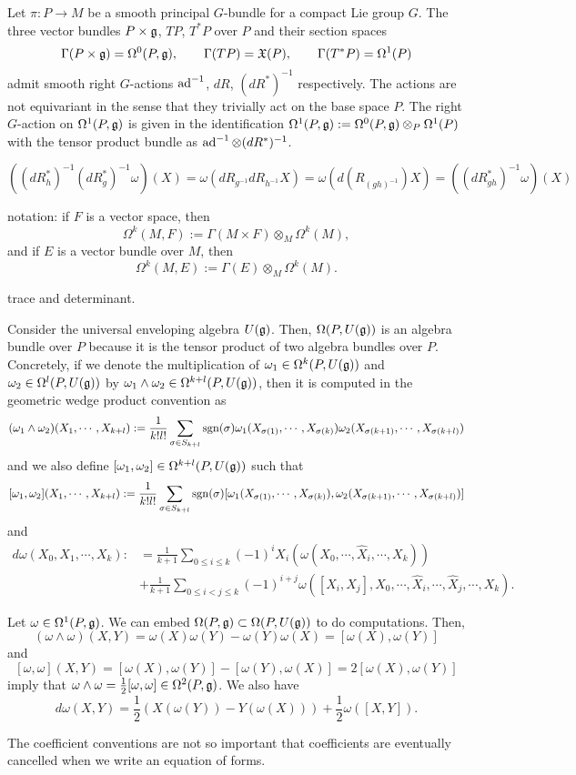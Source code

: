 \documentclass{../../large}
\begin{document}
\begin{prb}
Let $\pi:P\to M$ be a smooth principal $G$-bundle for a compact Lie group $G$.
The three vector bundles $P\times\mathfrak{g}$, $TP$, $T^*P$ over $P$ and their section spaces
\[\Gamma(P\times\mathfrak{g})=\Omega^0(P,\mathfrak{g}),\qquad\Gamma(TP)=\mathfrak{X}(P),\qquad\Gamma(T^*P)=\Omega^1(P)\]
admit smooth right $G$-actions $\operatorname{ad}^{-1}$, $dR$, $(dR^*)^{-1}$ respectively.
The actions are not equivariant in the sense that they trivially act on the base space $P$.
The right $G$-action on $\Omega^1(P,\mathfrak{g})$ is given in the identification $\Omega^1(P,\mathfrak{g}):=\Omega^0(P,\mathfrak{g})\otimes_P\Omega^1(P)$ with the tensor product bundle as $\operatorname{ad}^{-1}\otimes(dR^*)^{-1}$.

\[((dR^*_h)^{-1}(dR^*_g)^{-1}\omega)(X)
=\omega(dR_{g^{-1}}dR_{h^{-1}}X)
=\omega(d(R_{(gh)^{-1}})X)
=((dR^*_{gh})^{-1}\omega)(X)\]


notation: if $F$ is a vector space, then
\[\Omega^k(M,F):=\Gamma(M\times F)\otimes_M\Omega^k(M),\]
and if $E$ is a vector bundle over $M$, then
\[\Omega^k(M,E):=\Gamma(E)\otimes_M\Omega^k(M).\]

 trace and determinant.

Consider the universal enveloping algebra $U(\mathfrak{g})$.
Then, $\Omega(P,U(\mathfrak{g}))$ is an algebra bundle over $P$ because it is the tensor product of two algebra bundles over $P$.
Concretely, if we denote the multiplication of $\omega_1\in\Omega^k(P,U(\mathfrak{g}))$ and $\omega_2\in\Omega^l(P,U(\mathfrak{g}))$ by $\omega_1\wedge\omega_2\in\Omega^{k+l}(P,U(\mathfrak{g}))$, then it is computed in the geometric wedge product convention as
\[(\omega_1\wedge\omega_2)(X_1,\cdots,X_{k+l}):=\frac1{k!l!}\sum_{\sigma\in S_{k+l}}\operatorname{sgn}(\sigma)\omega_1(X_{\sigma(1)},\cdots,X_{\sigma(k)})\omega_2(X_{\sigma(k+1)},\cdots,X_{\sigma(k+l)})\]
and we also define $[\omega_1,\omega_2]\in\Omega^{k+l}(P,U(\mathfrak{g}))$ such that
\[[\omega_1,\omega_2](X_1,\cdots,X_{k+l}):=\frac1{k!l!}\sum_{\sigma\in S_{k+l}}\operatorname{sgn}(\sigma)[\omega_1(X_{\sigma(1)},\cdots,X_{\sigma(k)}),\omega_2(X_{\sigma(k+1)},\cdots,X_{\sigma(k+l)})]\]
and
\begin{align*}
d\omega(X_0,X_1,\cdots,X_k):&=\frac1{k+1}\sum_{0\le i\le k}(-1)^iX_i(\omega(X_0,\cdots,\hat X_i,\cdots,X_k))\\
&+\frac1{k+1}\sum_{0\le i<j\le k}(-1)^{i+j}\omega([X_i,X_j],X_0,\cdots,\hat X_i,\cdots,\hat X_j,\cdots,X_k).
\end{align*}

Let $\omega\in\Omega^1(P,\mathfrak{g})$.
We can embed $\Omega(P,\mathfrak{g})\subset\Omega(P,U(\mathfrak{g}))$ to do computations.
Then,
\[(\omega\wedge\omega)(X,Y)=\omega(X)\omega(Y)-\omega(Y)\omega(X)=[\omega(X),\omega(Y)]\]
and
\[[\omega,\omega](X,Y)=[\omega(X),\omega(Y)]-[\omega(Y),\omega(X)]=2[\omega(X),\omega(Y)]\]
imply that $\omega\wedge\omega=\frac12[\omega,\omega]\in\Omega^2(P,\mathfrak{g})$.
We also have
\[d\omega(X,Y)=\frac12(X(\omega(Y))-Y(\omega(X)))+\frac12\omega([X,Y]).\]

The coefficient conventions are not so important that coefficients are eventually cancelled when we write an equation of forms.
\end{prb}
\end{document}
